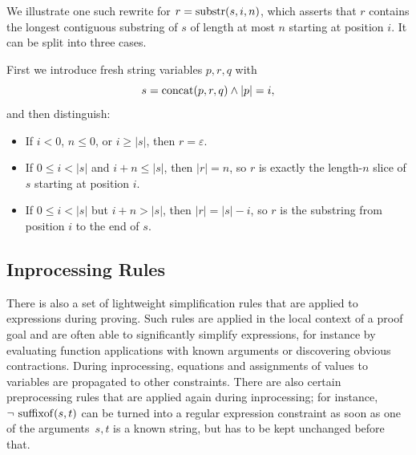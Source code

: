 We illustrate one such rewrite for $r = \operatorname{substr}(s,i,n)$, which asserts that $r$ contains the longest contiguous substring of $s$ of length at most $n$ starting at position $i$.
It can be split into three cases.

First we introduce fresh string variables $p,r,q$ with
\[
s = \operatorname{concat}(p, r, q) \land |p| = i,
\]
and then distinguish:

\begin{itemize}
	\item If $i<0$, $n\le0$, or $i\ge|s|$, then $r = \varepsilon$.

	\item If $0 \le i < |s|$ and $i + n \le |s|$, then $|r| = n$, so $r$ is exactly the length-$n$ slice of $s$ starting at position $i$.

	\item If $0 \le i < |s|$ but $i + n > |s|$, then $|r| = |s| - i$, so $r$ is the substring from position $i$ to the end of $s$.
\end{itemize}

\subsection{Inprocessing Rules}
\label{sec:inprocessing}

There is also a set of lightweight simplification rules that are applied to
expressions during proving. Such rules are applied in the local
context of a proof goal and are often able to significantly simplify
expressions, for instance by evaluating function applications with
known arguments or discovering obvious contractions. During
inprocessing, equations and assignments of values to variables are
propagated to other constraints. There are also
certain preprocessing rules that are applied again during
inprocessing; for instance, $\neg\,\operatorname{suffixof}(s,t)$ can be turned into
a regular expression constraint as soon as one of the arguments~$s, t$
is a known string, but has to be kept unchanged before that.

